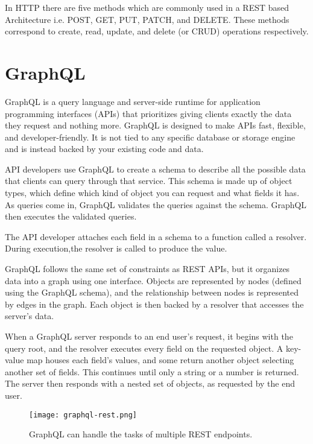 In HTTP there are five methods which are commonly used in a REST based Architecture 
i.e. POST, GET, PUT, PATCH, and DELETE. These methods correspond to create, read, 
update, and delete (or CRUD) operations respectively.

\section{GraphQL}

GraphQL is a query language and server-side runtime for application programming interfaces (APIs) 
that prioritizes giving clients exactly the data they request and nothing more. 
GraphQL is designed to make APIs fast, flexible, and developer-friendly. It is not tied 
to any specific database or storage engine and is instead backed by your existing code and data.

API developers use GraphQL to create a schema to describe all the possible data that clients can query 
through that service. This schema is made up of object types, which define which kind of object you can 
request and what fields it has. As queries come in, GraphQL validates the queries against the schema. 
GraphQL then executes the validated queries.

The API developer attaches each field in a schema to a function called a resolver. 
During execution,the resolver is called to produce the value.

GraphQL follows the same set of constraints as REST APIs, but it organizes data into a 
graph using one interface. Objects are represented by nodes (defined using the GraphQL schema), 
and the relationship between nodes is represented by edges in the graph. Each object is then backed 
by a resolver that accesses the server’s data.

When a GraphQL server responds to an end user’s request, it begins with the query root,
and the resolver executes every field on the requested object. A key-value map houses each field’s
values, and some return another object selecting another set of fields. This continues until only a 
string or a number is returned. The server then responds with a nested set of objects, as requested by 
the end user.

\begin{figure}
    \begin{center}
        \texttt{[image: graphql-rest.png]}
    \end{center}
    \caption{GraphQL can handle the tasks of multiple REST endpoints.}
    \label{fig:graphql}
\end{figure}
  
